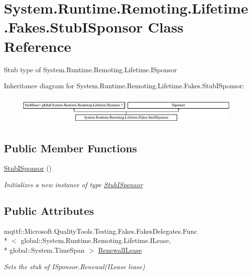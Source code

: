 \hypertarget{class_system_1_1_runtime_1_1_remoting_1_1_lifetime_1_1_fakes_1_1_stub_i_sponsor}{\section{System.\-Runtime.\-Remoting.\-Lifetime.\-Fakes.\-Stub\-I\-Sponsor Class Reference}
\label{class_system_1_1_runtime_1_1_remoting_1_1_lifetime_1_1_fakes_1_1_stub_i_sponsor}
}


Stub type of System.\-Runtime.\-Remoting.\-Lifetime.\-I\-Sponsor 


Inheritance diagram for System.\-Runtime.\-Remoting.\-Lifetime.\-Fakes.\-Stub\-I\-Sponsor\-:\begin{figure}[H]
\begin{center}
\leavevmode
\includegraphics[height=1.477572cm]{class_system_1_1_runtime_1_1_remoting_1_1_lifetime_1_1_fakes_1_1_stub_i_sponsor}
\end{center}
\end{figure}
\subsection*{Public Member Functions}
\begin{DoxyCompactItemize}
\item 
\hyperlink{class_system_1_1_runtime_1_1_remoting_1_1_lifetime_1_1_fakes_1_1_stub_i_sponsor_a7b097673e76da005094d9b57a735de08}{Stub\-I\-Sponsor} ()
\begin{DoxyCompactList}\small\item\em Initializes a new instance of type \hyperlink{class_system_1_1_runtime_1_1_remoting_1_1_lifetime_1_1_fakes_1_1_stub_i_sponsor}{Stub\-I\-Sponsor}\end{DoxyCompactList}\end{DoxyCompactItemize}
\subsection*{Public Attributes}
\begin{DoxyCompactItemize}
\item 
mqttf\-::\-Microsoft.\-Quality\-Tools.\-Testing.\-Fakes.\-Fakes\-Delegates.\-Func\\*
$<$ global\-::\-System.\-Runtime.\-Remoting.\-Lifetime.\-I\-Lease, \\*
global\-::\-System.\-Time\-Span $>$ \hyperlink{class_system_1_1_runtime_1_1_remoting_1_1_lifetime_1_1_fakes_1_1_stub_i_sponsor_ac09b961ff7c0af374fa46e566e075ee1}{Renewal\-I\-Lease}
\begin{DoxyCompactList}\small\item\em Sets the stub of I\-Sponsor.\-Renewal(\-I\-Lease lease)\end{DoxyCompactList}\end{DoxyCompactItemize}


